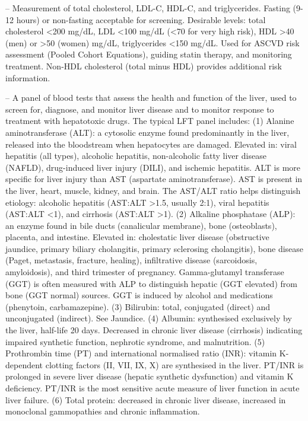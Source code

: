 -- Measurement of total cholesterol, LDL-C, HDL-C, and triglycerides. Fasting (9-12 hours) or non-fasting acceptable for screening. Desirable levels: total cholesterol <200 mg/dL, LDL <100 mg/dL (<70 for very high risk), HDL >40 (men) or >50 (women) mg/dL, triglycerides <150 mg/dL. Used for ASCVD risk assessment (Pooled Cohort Equations), guiding statin therapy, and monitoring treatment. Non-HDL cholesterol (total minus HDL) provides additional risk information.

-- A panel of blood tests that assess the health and function of the liver, used to screen for, diagnose, and monitor liver disease and to monitor response to treatment with hepatotoxic drugs. The typical LFT panel includes: (1) Alanine aminotransferase (ALT): a cytosolic enzyme found predominantly in the liver, released into the bloodstream when hepatocytes are damaged. Elevated in: viral hepatitis (all types), alcoholic hepatitis, non-alcoholic fatty liver disease (NAFLD), drug-induced liver injury (DILI), and ischemic hepatitis. ALT is more specific for liver injury than AST (aspartate aminotransferase). AST is present in the liver, heart, muscle, kidney, and brain. The AST/ALT ratio helps distinguish etiology: alcoholic hepatitis (AST:ALT >1.5, usually 2:1), viral hepatitis (AST:ALT <1), and cirrhosis (AST:ALT >1). (2) Alkaline phosphatase (ALP): an enzyme found in bile ducts (canalicular membrane), bone (osteoblasts), placenta, and intestine. Elevated in: cholestatic liver disease (obstructive jaundice, primary biliary cholangitis, primary sclerosing cholangitis), bone disease (Paget, metastasis, fracture, healing), infiltrative disease (sarcoidosis, amyloidosis), and third trimester of pregnancy. Gamma-glutamyl transferase (GGT) is often measured with ALP to distinguish hepatic (GGT elevated) from bone (GGT normal) sources. GGT is induced by alcohol and medications (phenytoin, carbamazepine). (3) Bilirubin: total, conjugated (direct) and unconjugated (indirect). See Jaundice. (4) Albumin: synthesised exclusively by the liver, half-life 20 days. Decreased in chronic liver disease (cirrhosis) indicating impaired synthetic function, nephrotic syndrome, and malnutrition. (5) Prothrombin time (PT) and international normalised ratio (INR): vitamin K-dependent clotting factors (II, VII, IX, X) are synthesised in the liver. PT/INR is prolonged in severe liver disease (hepatic synthetic dysfunction) and vitamin K deficiency. PT/INR is the most sensitive acute measure of liver function in acute liver failure. (6) Total protein: decreased in chronic liver disease, increased in monoclonal gammopathies and chronic inflammation.

